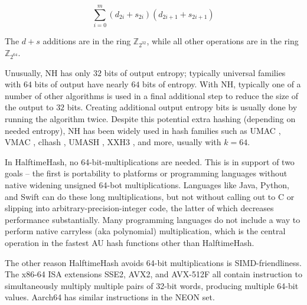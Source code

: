 \documentclass[sigconf, nonacm]{acmart}
\newcommand{\ints}{\mathbb{Z}}
\begin{document}
\[
\sum_{i=0}^m (d_{2i} + s_{2i})(d_{2i+1} + s_{2i+1})
\]

The $d + s$ additions are in the ring $\ints_{2^{32}}$, while all other operations are in the ring $\ints_{2^{64}}$.

Unusually, NH has only $32$ bits of output entropy; typically universal families with $64$ bits of output have nearly $64$ bits of entropy. \cite{umash,clhash}
With NH, typically one of a number of other algorithms is used in a final additional step to reduce the size of the output to $32$ bits.
Creating additional output entropy bits is usually done by running the algorithm twice. \cite{umash,umac}
Despite this potential extra hashing (depending on needed entropy), NH has been widely used in hash families such as UMAC \cite{umac}, VMAC \cite{vmac}, clhash \cite{clhash}, UMASH \cite{umash}, XXH3 \cite{xxh3}, and more, usually with $k = 64$.

In HalftimeHash, no 64-bit-mul\-ti\-pli\-ca\-tions are needed.
This is in support of two goals --
the first is portability to platforms or programming languages without native widening unsigned 64-bot multiplications.
Languages like Java, Python, and Swift can do these long multiplications, but not without calling out to C or slipping into arbitrary-precision-integer code, the latter of which decreases performance substantially.
Many programming languages do not include a way to perform native carryless (aka polynomial) multiplication, which is the central operation in the fastest AU hash functions other than HalftimeHash. \cite{umash,clhash}


The other reason HalftimeHash avoids 64-bit multiplications is SIMD-friendliness.
The x86-64 ISA extensions SSE2, AVX2, and AVX-512F all contain instruction to simultaneously multiply multiple pairs of 32-bit words, producing multiple 64-bit values.
Aarch64 has similar instructions in the NEON set.



\end{document}
